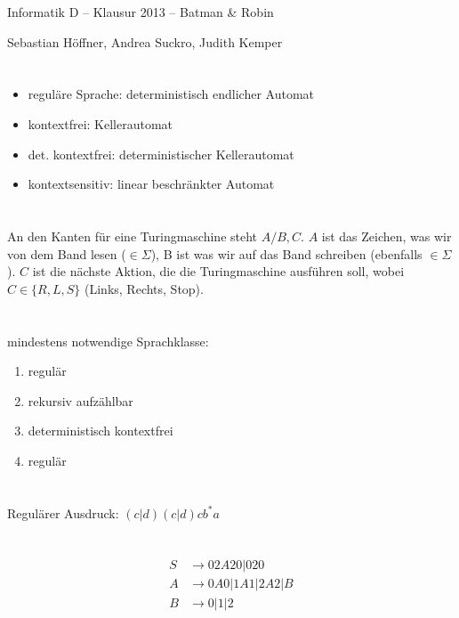 \documentclass{article}
\begin{document}
\begin{center}
  \Large{Informatik D -- Klausur 2013 -- Batman \& Robin}

  \large{Sebastian Höffner, Andrea Suckro, Judith Kemper}
\end{center}

\section{}
\begin{itemize}
	\item reguläre Sprache: deterministisch endlicher Automat
  \item kontextfrei: Kellerautomat
  \item det. kontextfrei: deterministischer Kellerautomat
  \item kontextsensitiv: linear beschränkter Automat
\end{itemize}

\section{}
An den Kanten für eine Turingmaschine steht $A/B,C$. $A$ ist das Zeichen, was wir von dem Band lesen ($\in \Sigma$), B ist was wir auf das Band schreiben (ebenfalls $\in \Sigma$). $C$ ist die nächste Aktion, die die Turingmaschine ausführen soll, wobei $C \in \{R, L, S\}$ (Links, Rechts, Stop). 

\section{}
mindestens notwendige Sprachklasse:
\begin{enumerate}
	\item regulär
  \item rekursiv aufzählbar
  \item deterministisch kontextfrei
  \item regulär
\end{enumerate}

\section{}
Regulärer Ausdruck: $(c|d)(c|d)cb^*a$

\section{}
\begin{align*}
S&\rightarrow 02A20 | 020\\
A&\rightarrow 0A0 | 1A1 | 2A2 | B\\
B&\rightarrow 0|1|2
\end{align*}
\end{document}
